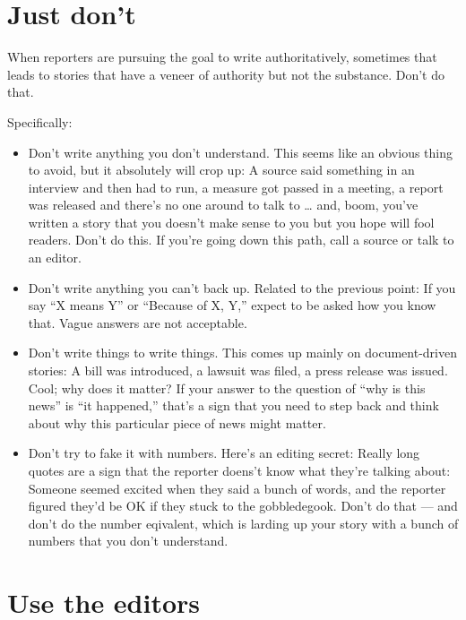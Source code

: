 \documentclass[
  11pt,
  american,
  letterpaperpaper,
  extrafontsizes,onecolumn,openright
  ]{memoir}
\providecommand{\tightlist}{%
  \setlength{\itemsep}{0pt}\setlength{\parskip}{0pt}}
\begin{document}
\hypertarget{just-dont}{%
\section*{Just don't}\label{just-dont}}

When reporters are pursuing the goal to write authoritatively, sometimes that leads to stories that have a veneer of authority but not the substance. Don't do that.

Specifically:

\begin{itemize}
\tightlist
\item
  Don't write anything you don't understand. This seems like an obvious thing to avoid, but it absolutely will crop up: A source said something in an interview and then had to run, a measure got passed in a meeting, a report was released and there's no one around to talk to \ldots{} and, boom, you've written a story that you doesn't make sense to you but you hope will fool readers. Don't do this. If you're going down this path, call a source or talk to an editor.
\item
  Don't write anything you can't back up. Related to the previous point: If you say \enquote{X means Y} or \enquote{Because of X, Y,} expect to be asked how you know that. Vague answers are not acceptable.
\item
  Don't write things to write things. This comes up mainly on document-driven stories: A bill was introduced, a lawsuit was filed, a press release was issued. Cool; why does it matter? If your answer to the question of \enquote{why is this news} is \enquote{it happened,} that's a sign that you need to step back and think about why this particular piece of news might matter.
\item
  Don't try to fake it with numbers. Here's an editing secret: Really long quotes are a sign that the reporter doens't know what they're talking about: Someone seemed excited when they said a bunch of words, and the reporter figured they'd be OK if they stuck to the gobbledegook. Don't do that --- and don't do the number eqivalent, which is larding up your story with a bunch of numbers that you don't understand.
\end{itemize}

\hypertarget{use-the-editors}{%
\section*{Use the editors}\label{use-the-editors}}
\end{document}
